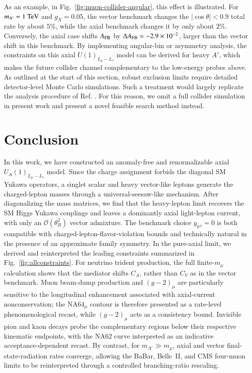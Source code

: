 \documentclass[onecolumn, aps, nofootinbib, prd, preprint, floats, floatfix, amsmath, amssymb, superscriptaddress, preprintnumbers]{revtex4-2}
\begin{document}
As an example, in Fig.~\ref{fig:muon-collider-angular}, this effect is illustrated. For $m_{A'}=1~{\rm TeV}$ and $g_X=0.05$, the vector benchmark changes the $|\cos\theta|<0.9$ total rate by about $5\%$, while the axial benchmark changes it by only about $2\%$. Conversely, the axial case shifts $A_{\rm FB}$ by $\Delta A_{\rm FB}\simeq-2.9\times10^{-2}$, larger than the vector shift in this benchmark. By implementing angular-bin or asymmetry analysis, the constraints on this axial $U(1)_{L_\mu-L_\tau}$ model can be derived for heavy $A'$, which makes the future collider channel complementary to the low-energy probes above. As outlined at the start of this section, robust exclusion limits require detailed detector-level Monte Carlo simulations. Such a treatment would largely replicate the analysis procedure of Ref. \cite{Huang:2021nkl}. For this reason, we omit a full collider simulation in present work and present a novel feasible search method instead.


\section{Conclusion}
\label{sec:conclusion}

In this work, we have constructed an anomaly-free and renormalizable axial $U_A(1)_{L_\mu-L_\tau}$ model. Since the charge assignment forbids the diagonal SM Yukawa operators, a singlet scalar and heavy vector-like leptons generate the charged-lepton masses through a universal-seesaw-like mechanism. After diagonalizing the mass matrices, we find that the heavy-lepton limit recovers the SM Higgs Yukawa couplings and leaves a dominantly axial light-lepton current, with only an $\mathcal O(\theta_R^2)$ vector admixture. The benchmark choice $y_{\mu\tau}=0$ is both compatible with charged-lepton-flavor-violation bounds and technically natural in the presence of an approximate family symmetry.
In the pure-axial limit, we derived and reinterpreted the leading constraints summarized in Fig.~\ref{fig:allconstraints}. For neutrino trident production, the full finite-$m_\mu$ calculation shows that the mediator shifts $C_A$, rather than $C_V$ as in the vector benchmark. Muon beam-dump production and $(g-2)_\mu$ are particularly sensitive to the longitudinal enhancement associated with axial-current nonconservation; the NA64$_\mu$ contour is therefore presented as a rate-level phenomenological recast, while $(g-2)_\mu$ acts as a consistency bound. Invisible pion and kaon decays probe the complementary regions below their respective kinematic endpoints, with the NA62 curve interpreted as an indicative acceptance-dependent recast. By contrast, for $m_{A'}\gg m_\mu$, axial and vector final-state-radiation rates converge, allowing the BaBar, Belle~II, and CMS four-muon limits to be reinterpreted through a controlled branching-ratio rescaling.
\end{document}
